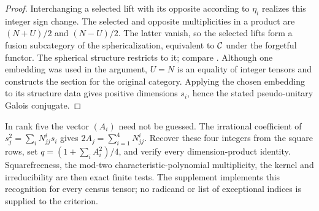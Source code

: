 \begin{proof}
Interchanging a selected lift with its opposite according to $\eta_i$
realizes this integer sign change. The selected and opposite
multiplicities in a product are $(N+U)/2$ and $(N-U)/2$. The latter
vanish, so the selected lifts form a fusion subcategory of the
sphericalization, equivalent to $\mathcal C$ under the forgetful functor.
The spherical structure restricts to it; compare
\cite[Section 5.1]{Ostrik}. Although one embedding was used in the
argument, $U=N$ is an equality of integer tensors and constructs the
section for the original category. Applying the chosen embedding to
its structure data gives positive dimensions $s_i$, hence the stated
pseudo-unitary Galois conjugate.
\end{proof}

\begin{remark}
In rank five the vector $(A_i)$ need not be guessed. The irrational
coefficient of $s_j^2=\sum_iN_{jj}^i s_i$ gives
$2A_j=\sum_{i=1}^4N_{jj}^i$. Recover these four integers from the square
rows, set $q=(1+\sum_iA_i^2)/4$, and verify every dimension-product
identity. Squarefreeness, the mod-two characteristic-polynomial
multiplicity, the kernel and irreducibility are then exact finite tests.
The supplement implements this recognition for every census tensor;
no radicand or list of exceptional indices is supplied to the criterion.
\end{remark}
